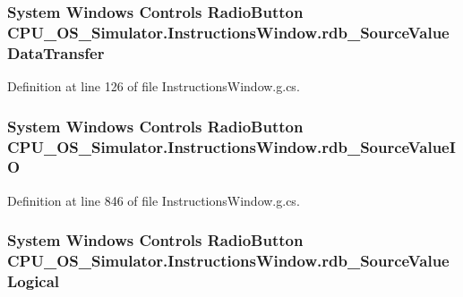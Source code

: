 \subsubsection[{rdb\+\_\+\+Source\+Value\+Data\+Transfer}]{\setlength{\rightskip}{0pt plus 5cm}System Windows Controls Radio\+Button C\+P\+U\+\_\+\+O\+S\+\_\+\+Simulator.\+Instructions\+Window.\+rdb\+\_\+\+Source\+Value\+Data\+Transfer\hspace{0.3cm}{\ttfamily [package]}}\label{class_c_p_u___o_s___simulator_1_1_instructions_window_a0798a7bfaace0c96650cf9df53fbf6fd}


Definition at line 126 of file Instructions\+Window.\+g.\+cs.

\hypertarget{class_c_p_u___o_s___simulator_1_1_instructions_window_ad7bb114a6f948e79e55a44943ecf660a}{}
\subsubsection[{rdb\+\_\+\+Source\+Value\+I\+O}]{\setlength{\rightskip}{0pt plus 5cm}System Windows Controls Radio\+Button C\+P\+U\+\_\+\+O\+S\+\_\+\+Simulator.\+Instructions\+Window.\+rdb\+\_\+\+Source\+Value\+I\+O\hspace{0.3cm}{\ttfamily [package]}}\label{class_c_p_u___o_s___simulator_1_1_instructions_window_ad7bb114a6f948e79e55a44943ecf660a}


Definition at line 846 of file Instructions\+Window.\+g.\+cs.

\hypertarget{class_c_p_u___o_s___simulator_1_1_instructions_window_ad0e882b0d6d067460309ae6f1dda5d56}{}
\subsubsection[{rdb\+\_\+\+Source\+Value\+Logical}]{\setlength{\rightskip}{0pt plus 5cm}System Windows Controls Radio\+Button C\+P\+U\+\_\+\+O\+S\+\_\+\+Simulator.\+Instructions\+Window.\+rdb\+\_\+\+Source\+Value\+Logical\hspace{0.3cm}{\ttfamily [package]}}\label{class_c_p_u___o_s___simulator_1_1_instructions_window_ad0e882b0d6d067460309ae6f1dda5d56}


